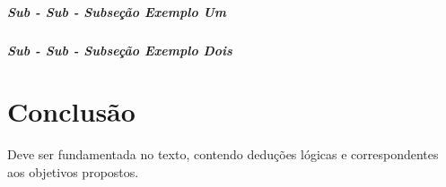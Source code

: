 \documentclass[
  12pt,		%
  a4paper,	%
  openright,%
  oneside,	%
  chapter=TITLE,		%
  section=TITLE,		%
  english,	%
  french,	%
  spanish,	%
  brazil	%
]{abntex2}
\begin{document}
                        \paragraph{Sub - Sub - Subseção Exemplo Um}
                        \lipsum[11]
                        
                        \paragraph{Sub - Sub - Subseção Exemplo Dois}
                        \lipsum[13]

    \chapter{Conclusão}
    
        Deve ser fundamentada no texto, contendo deduções lógicas e correspondentes aos objetivos propostos.
    
    
    \postextual
    
    
    
    
    
\end{document}

